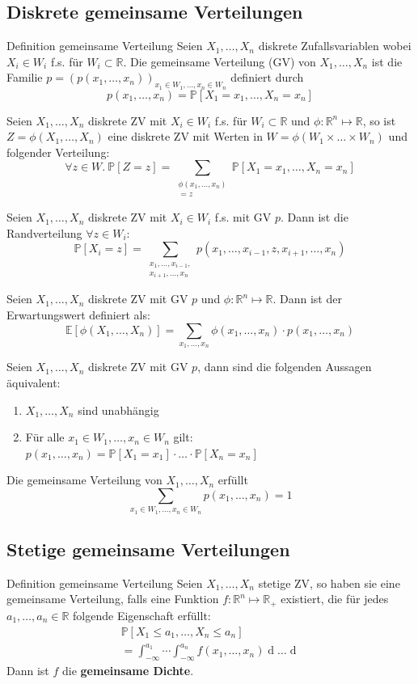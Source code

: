 \documentclass[a4paper,10pt]{article}
\def\R{\mathbb{R}}
\def\P{\mathbb{P}}
\def\E{\mathbb{E}}
\begin{document}
\subsection{Diskrete gemeinsame Verteilungen}
\begin{subbox}{Definition gemeinsame Verteilung}
	Seien \(X_1, \ldots, X_n\) diskrete Zufallsvariablen wobei \(X_i \in W_i\) f.s. für \(W_i \subset \R\). Die gemeinsame Verteilung (GV) von \(X_1, \ldots, X_n\) ist die Familie \(p = (p(x_1, \ldots, x_n))_{x_1 \in W_1, \ldots, x_n \in W_n}\) definiert durch
	\[p(x_1, \ldots, x_n) = \P[X_1 = x_1, \ldots, X_n = x_n]\]
\end{subbox}

Seien \(X_1,\ldots,X_n\) diskrete ZV mit \(X_i \in W_i\) f.s. für \(W_i \subset \R\) und \(\phi: \R^n \mapsto \R\), so ist \(Z = \phi(X_1, \ldots, X_n)\) eine diskrete ZV mit Werten in \(W = \phi(W_1 \times \ldots \times W_n)\) und folgender Verteilung:
\[\forall z \in W. \ \P[Z = z] = \sum_{\substack{\phi(x_1, \ldots, x_n) \\= z}} \P[X_1 = x_1, \ldots, X_n = x_n]\]

Seien \(X_1,\ldots,X_n\) diskrete ZV mit \(X_i \in W_i\) f.s. mit GV \(p\). Dann ist die Randverteilung \(\forall z \in W_i\):
\[\P[X_i = z] = \sum_{\substack{x_1, \ldots, x_{i-1}, \\x_{i+1},\ldots,x_n}} p(x_1, \ldots, x_{i-1}, z, x_{i+1},\ldots,x_n)\]

Seien \(X_1,\ldots,X_n\) diskrete ZV mit GV \(p\) und \(\phi : \R^n \mapsto \R\). Dann ist der Erwartungswert definiert als:
\[\E[\phi(X_1, \ldots, X_n)] = \sum_{x_1,\ldots,x_n} \phi(x_1,\ldots,x_n) \cdot p(x_1,\ldots,x_n)\]

Seien \(X_1,\ldots,X_n\) diskrete ZV mit GV \(p\), dann sind die folgenden Aussagen äquivalent:
\begin{enumerate}
	\item \(X_1,\ldots,X_n\) sind unabhängig
	\item Für alle \(x_1 \in W_1, \ldots, x_n \in W_n\) gilt:
	      \(p(x_1,\ldots,x_n) = \P[X_1 = x_1] \cdot \ldots \cdot \P[X_n = x_n]\)
\end{enumerate}

Die gemeinsame Verteilung von \(X_1, \ldots, X_n\) erfüllt
\[\sum_{x_1\in W_1, \ldots, x_n \in W_n} p(x_1, \ldots, x_n) = 1\]

\subsection{Stetige gemeinsame Verteilungen}
\begin{subbox}{Definition gemeinsame Verteilung}
	Seien \(X_1, \ldots, X_n\) stetige ZV, so haben sie eine gemeinsame Verteilung, falls eine Funktion \(f: \R^n \mapsto \R_+\) existiert, die für jedes \(a_1, \ldots, a_n \in \R\) folgende Eigenschaft erfüllt:
	\begin{align*}
		\P[X_1 \le a_1, \ldots, X_n \le a_n] \\= \int_{-\infty}^{a_1} \cdots \int_{-\infty}^{a_n} f(x_1, \ldots, x_n) \mathop{dx_n} \ldots \mathop{dx_1}
	\end{align*}
	Dann ist \(f\) die \textbf{gemeinsame Dichte}.
\end{subbox}
\end{document}

